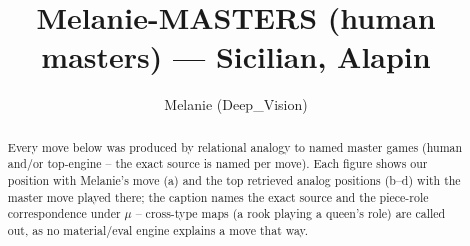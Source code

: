 \documentclass[11pt]{article}
\title{Melanie-MASTERS (human masters) — Sicilian, Alapin}
\author{Melanie (Deep\_Vision)}
\date{}
\begin{document}
\maketitle

\begin{abstract}Every move below was produced by relational analogy to named master games (human and/or top-engine -- the exact source is named per move). Each figure shows our position with Melanie's move (a) and the top retrieved analog positions (b--d) with the master move played there; the caption names the exact source and the piece-role correspondence under $\mu$ -- cross-type maps (a rook playing a queen's role) are called out, as no material/eval engine explains a move that way.\end{abstract}

\begin{figure}[p]\centering
\begin{subfigure}{0.46\textwidth}\centering
\resizebox{\linewidth}{!}{%
\newchessgame
\chessboard[
  setfen={r1bqkb1r/pp2pppp/2np4/3BP3/3P3P/5N2/PP3PP1/RNBQK2R b KQq - 0 9},
  showmover=false,
  pgfstyle=straightmove, color=movearrow, markmove={e7-e6}
]}
\caption{}
\end{subfigure}\hfill
\begin{subfigure}{0.46\textwidth}\centering
\resizebox{\linewidth}{!}{%
\newchessgame
\chessboard[
  setfen={r1bqk2r/1p3ppp/p2b1n2/3p4/P2p4/2N5/BPPP1PPP/R1BQ1RK1 w kq - 0 11},
  showmover=false,
  pgfstyle=straightmove, color=movearrow, markmove={f1-e1}
]}
\caption{}
\end{subfigure}
\\[4pt]
\begin{subfigure}{0.46\textwidth}\centering
\resizebox{\linewidth}{!}{%
\newchessgame
\chessboard[
  setfen={r3k2r/ppq2ppp/2pbpn2/4N3/2BPb1PP/2P5/PP2QP2/R1B1K2R w KQkq - 3 14},
  showmover=false,
  pgfstyle=straightmove, color=movearrow, markmove={f2-f3}
]}
\caption{}
\end{subfigure}\hfill
\begin{subfigure}{0.46\textwidth}\centering
\resizebox{\linewidth}{!}{%
\newchessgame
\chessboard[
  setfen={r3k2r/1b2q1pp/p2bpn2/1p2n1N1/2p1P3/2N5/PPB1QPPP/R1B1R1K1 w kq - 6 17},
  showmover=false,
  pgfstyle=straightmove, color=movearrow, markmove={f2-f4}
]}
\caption{}
\end{subfigure}

\end{figure}
\end{document}
